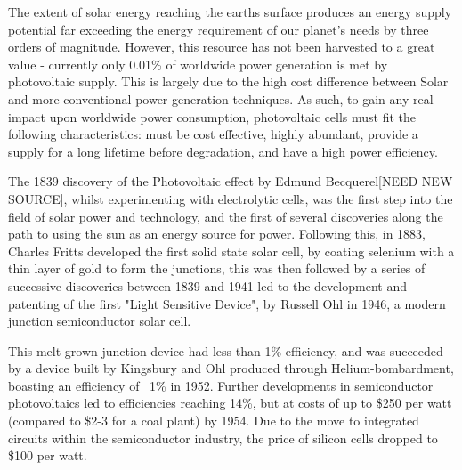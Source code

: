 %
%
%
%
%

The extent of solar energy reaching the earths surface produces an energy supply potential far exceeding the energy requirement of our planet's needs by three orders of magnitude.\citep{Morton2006} However, this resource has not been harvested to a great value - currently only 0.01\% of worldwide power generation is met by photovoltaic supply. \citep{Mitzi2011} This is largely due to the high cost difference between Solar and more conventional power generation techniques. As such, to gain any real impact upon worldwide power consumption, photovoltaic cells must fit the following characteristics: must be cost effective, highly abundant, provide a supply for a long lifetime before degradation, and have a high power efficiency.

The 1839 discovery of the Photovoltaic effect by Edmund Becquerel[NEED NEW SOURCE], whilst experimenting with electrolytic cells, was the first step into the field of solar power and technology, and the first of several discoveries along the path to using the sun as an energy source for power. Following this, in 1883, Charles Fritts\citep{Fritts1883} developed the first solid state solar cell, by coating selenium with a thin layer of gold to form the junctions, this was then followed by a series of successive discoveries between 1839 and 1941 led to the development and patenting of the first "Light Sensitive Device", by Russell Ohl in 1946, a modern junction semiconductor solar cell.\citep{Green2009a} 

This melt grown junction device had less than 1\% efficiency, and was succeeded by a device built by Kingsbury and Ohl produced through Helium-bombardment, boasting an efficiency of ~1\% in 1952.\citep{Green2009a} Further developments in semiconductor photovoltaics led to efficiencies reaching 14\%, but at costs of up to \$250 per watt (compared to \$2-3 for a coal plant) by 1954. Due to the move to integrated circuits within the semiconductor industry, the price of silicon cells dropped to \$100 per watt.


